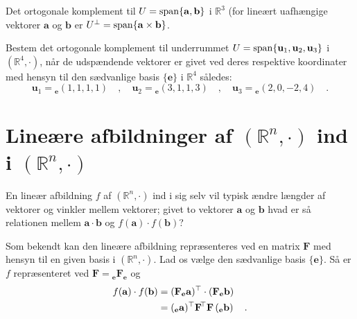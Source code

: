 \begin{example}
Det ortogonale komplement til $U = \mathrm{span}\{\mathbf{a}, \mathbf{b}\}$ i $\mathbb{R}^{3}$ (for lineært uafhængige vektorer $\mathbf{a}$ og $\mathbf{b}$ er $U^{\bot} = \mathrm{span}\{\mathbf{a} \times \mathbf{b}\}$.
\end{example}

\begin{exercise}
Bestem det ortogonale komplement til underrummet $U = \mathrm{span}\{\mathbf{u}_{1}, \mathbf{u}_{2}, \mathbf{u}_{3}\}$
i $(\mathbb{R}^{4}, \cdot)$, når de udspændende vektorer er givet ved deres respektive koordinater med hensyn til den sædvanlige basis $\{ \mathbf{e} \}$ i $\mathbb{R}^{4}$ således:
\begin{equation}
\mathbf{u}_{1} = {_{\mathbf{e}}(1,1,1,1)} \quad , \quad \mathbf{u}_{2} = {_{\mathbf{e}}(3,1,1,3)} \quad , \quad \mathbf{u}_{3} = {_{\mathbf{e}}(2,0,-2,4)} \quad .
\end{equation}
\end{exercise}




\section{Lineære afbildninger af $(\mathbb{R}^{n}, \cdot)$ ind i $(\mathbb{R}^{n}, \cdot)$} \label{secLinAfb}

En lineær afbildning $f$ af $(\mathbb{R}^{n}, \cdot)$ ind i sig selv vil typisk ændre længder af vektorer og vinkler mellem vektorer; givet to vektorer $\mathbf{a}$ og $\mathbf{b}$ hvad er så relationen mellem $\mathbf{a}\cdot \mathbf{b}$ og $f(\mathbf{a}) \cdot f(\mathbf{b})$? \bs

Som bekendt kan den lineære afbildning repræsenteres ved en matrix $\mathbf{F}$ med hensyn til en given basis i $(\mathbb{R}^{n}, \cdot)$. Lad os vælge den sædvanlige basis $\{ \mathbf{e} \}$. Så er $f$ repræsenteret ved $ \mathbf{F} = {_{\mathbf{e}}\mathbf{F}}{_{\mathbf{e}}}$ og
\begin{equation} \label{eqLinAfbSkalar}
\begin{aligned}
f(\mathbf{a}) \cdot f(\mathbf{b}) &= \left(\mathbf{F}{_{\mathbf{e}}}\mathbf{a}\right)\hspace*{-.6mm}^{\top} \cdot  \left(\mathbf{F}_{\mathbf{e}}\mathbf{b}\right)\\
&= \left(_{\mathbf{e}}\mathbf{a}\right)\hspace*{-.6mm}^{\top} \mathbf{F}\hspace*{-.6mm}^{\top} \mathbf{F} \left(_{\mathbf{e}}\mathbf{b}\right) \quad .
\end{aligned}
\end{equation}


